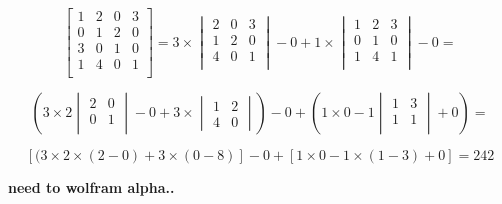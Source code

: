 \begin{exmp}
    \[
    \begin{bmatrix}
        1   &   2   &   0   &   3 \\
        0   &   1   &   2   &   0 \\
        3   &   0  &    1   &   0 \\
        1   &   4   &   0  &    1  \\
    \end{bmatrix}
    = 3 \times 
    \begin{vmatrix}
        2   &   0   &   3 \\
        1   &   2   &   0 \\
        4   &   0   &   1 \\
    \end{vmatrix}
    - 0
    + 1 \times
     \begin{vmatrix}
        1   &   2   &   3 \\
        0   &   1   &   0 \\
        1   &   4   &   1 \\
    \end{vmatrix}
    - 0 = \] 

    \[ (3 \times 2
    \begin{vmatrix}
        2   &   0 \\
        0   &   1  \\
    \end{vmatrix}
    - 0 
    + 3 \times
    \begin{vmatrix}
        1   &   2 \\
        4   &   0
    \end{vmatrix} ) 
    - 0 
    + (1 \times 0 
    - 1 
    \begin{vmatrix}
        1   &   3 \\
        1   &   1 \\
    \end{vmatrix}
    + 0) =
    \]

    \[
        [(3 \times 2 \times (2 - 0) + 3 \times (0 - 8)] - 0 + [1 \times 0 - 1 \times (1 - 3) + 0]
        = 242
    \]
\end{exmp}
\textbf{need to wolfram alpha..} \\

